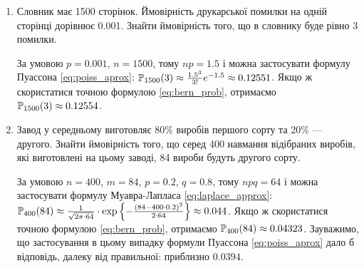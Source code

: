 \begin{example}
    \begin{enumerate}
        \item Словник має 1500 сторінок. Ймовірність друкарської помилки на одній сторінці дорівнює
        0.001. Знайти ймовірність того, що в словнику буде рівно 3 помилки.

        За умовою $p=0.001$, $n=1500$, тому $np = 1.5$ і можна застосувати формулу Пуассона \eqref{eq:poiss_aprox}:
        $\P_{1500}(3) \approx \frac{1.5^3}{3!} e^{-1.5} \approx 0.12551$.
        Якщо ж скористатися точною формулою \eqref{eq:bern_prob}, отримаємо
        $\P_{1500}(3) \approx 0.12554$.
        \item Завод у середньому виготовляє 80\% виробів першого сорту та 20\% --- другого.
        Знайти ймовірність того, що серед 400 навмання відібраних виробів, які виготовлені на цьому заводі,
        84 вироби будуть другого сорту.

        За умовою $n=400$, $m=84$, $p=0.2$, $q=0.8$, тому $npq = 64$ і можна застосувати формулу Муавра-Лапласа \eqref{eq:laplace_approx}:
        $\P_{400}(84) \approx \frac{1}{\sqrt{2\pi \cdot 64}} \cdot \exp\left\{
            -\frac{(84 - 400\cdot0.2)^2}{2\cdot 64}\right\} \approx 0.044$. 
            Якщо ж скористатися точною формулою \eqref{eq:bern_prob}, отримаємо
        $\P_{400}(84) \approx 0.04323$. Зауважимо, що застосування в цьому випадку формули Пуассона \eqref{eq:poiss_aprox}
        дало б відповідь, далеку від правильної: приблизно $0.0394$.
    \end{enumerate}
\end{example}